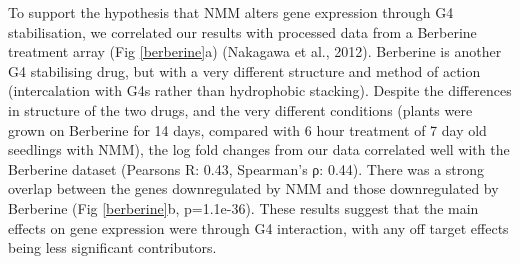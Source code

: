 \documentclass[12pt,a4paper,]{report}
\begin{document}
\newpage

To support the hypothesis that NMM alters gene expression through G4
stabilisation, we correlated our results with processed data from a
Berberine treatment array (Fig \ref{berberine}a) (Nakagawa et al.,
2012). Berberine is another G4 stabilising drug, but with a very
different structure and method of action (intercalation with G4s rather
than hydrophobic stacking). Despite the differences in structure of the
two drugs, and the very different conditions (plants were grown on
Berberine for 14 days, compared with 6 hour treatment of 7 day old
seedlings with NMM), the log fold changes from our data correlated well
with the Berberine dataset (Pearsons R: 0.43, Spearman's ρ: 0.44). There
was a strong overlap between the genes downregulated by NMM and those
downregulated by Berberine (Fig \ref{berberine}b, p=1.1e-36). These
results suggest that the main effects on gene expression were through G4
interaction, with any off target effects being less significant
contributors.

\newpage
\end{document}
